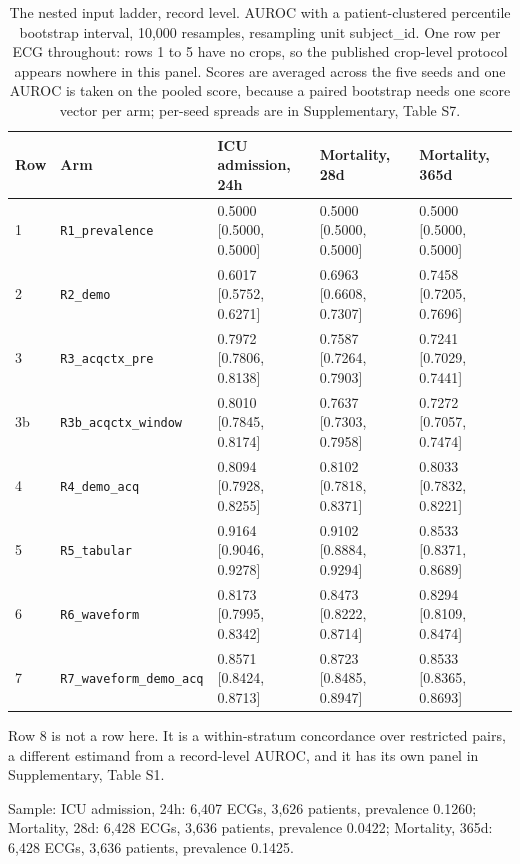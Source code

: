
\begin{table}[t]
\centering
\small
\caption{The nested input ladder, record level. AUROC with a patient-clustered percentile bootstrap interval, 10,000 resamples, resampling unit subject\_id. One row per ECG throughout: rows 1 to 5 have no crops, so the published crop-level protocol appears nowhere in this panel. Scores are averaged across the five seeds and one AUROC is taken on the pooled score, because a paired bootstrap needs one score vector per arm; per-seed spreads are in Supplementary, Table S7.}
\label{tab:ladder}
\begin{tabular}{lllll}
\toprule
Row & Arm & ICU admission, 24h & Mortality, 28d & Mortality, 365d \\
\midrule
1 & \texttt{R1\_prevalence} & 0.5000 [0.5000, 0.5000] & 0.5000 [0.5000, 0.5000] & 0.5000 [0.5000, 0.5000] \\
2 & \texttt{R2\_demo} & 0.6017 [0.5752, 0.6271] & 0.6963 [0.6608, 0.7307] & 0.7458 [0.7205, 0.7696] \\
3 & \texttt{R3\_acqctx\_pre} & 0.7972 [0.7806, 0.8138] & 0.7587 [0.7264, 0.7903] & 0.7241 [0.7029, 0.7441] \\
3b & \texttt{R3b\_acqctx\_window} & 0.8010 [0.7845, 0.8174] & 0.7637 [0.7303, 0.7958] & 0.7272 [0.7057, 0.7474] \\
4 & \texttt{R4\_demo\_acq} & 0.8094 [0.7928, 0.8255] & 0.8102 [0.7818, 0.8371] & 0.8033 [0.7832, 0.8221] \\
5 & \texttt{R5\_tabular} & 0.9164 [0.9046, 0.9278] & 0.9102 [0.8884, 0.9294] & 0.8533 [0.8371, 0.8689] \\
6 & \texttt{R6\_waveform} & 0.8173 [0.7995, 0.8342] & 0.8473 [0.8222, 0.8714] & 0.8294 [0.8109, 0.8474] \\
7 & \texttt{R7\_waveform\_demo\_acq} & 0.8571 [0.8424, 0.8713] & 0.8723 [0.8485, 0.8947] & 0.8533 [0.8365, 0.8693] \\
\bottomrule
\end{tabular}
\par\footnotesize Row 8 is not a row here. It is a within-stratum concordance over restricted pairs, a different estimand from a record-level AUROC, and it has its own panel in Supplementary, Table S1.
\par\footnotesize Sample: ICU admission, 24h: 6,407 ECGs, 3,626 patients, prevalence 0.1260; Mortality, 28d: 6,428 ECGs, 3,636 patients, prevalence 0.0422; Mortality, 365d: 6,428 ECGs, 3,636 patients, prevalence 0.1425.
\end{table}

